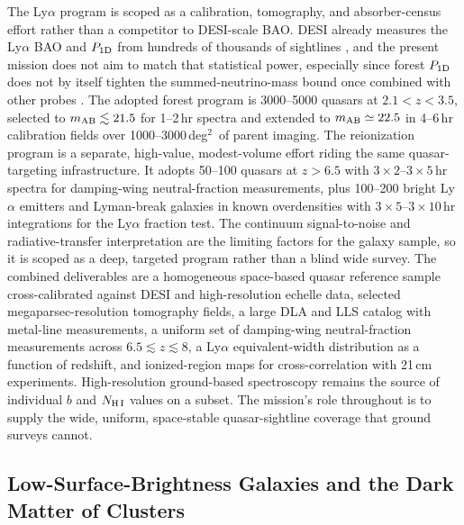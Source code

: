 \documentclass[10pt,onecolumn]{article}
\newcommand{\degti}{deg$^2$}
\begin{document}
The Ly$\alpha$ program is scoped as a calibration, tomography, and absorber-census effort rather than a competitor to DESI-scale BAO. DESI already measures the Ly$\alpha$ BAO and $P_{\rm 1D}$ from hundreds of thousands of sightlines \cite{desi2024lya,karacayli2025}, and the present mission does not aim to match that statistical power, especially since forest $P_{\rm 1D}$ does not by itself tighten the summed-neutrino-mass bound once combined with other probes \cite{chaves2026}. The adopted forest program is 3000--5000 quasars at $2.1<z<3.5$, selected to $m_{\rm AB}\lesssim21.5$ for 1--2\,hr spectra and extended to $m_{\rm AB}\simeq22.5$ in 4--6\,hr calibration fields over 1000--3000\,\degti\ of parent imaging. The reionization program is a separate, high-value, modest-volume effort riding the same quasar-targeting infrastructure. It adopts 50--100 quasars at $z>6.5$ with $3\times2$--$3\times5$\,hr spectra for damping-wing neutral-fraction measurements, plus 100--200 bright Ly$\alpha$ emitters and Lyman-break galaxies in known overdensities with $3\times5$--$3\times10$\,hr integrations for the Ly$\alpha$ fraction test. The continuum signal-to-noise and radiative-transfer interpretation are the limiting factors for the galaxy sample, so it is scoped as a deep, targeted program rather than a blind wide survey. The combined deliverables are a homogeneous space-based quasar reference sample cross-calibrated against DESI and high-resolution echelle data, selected megaparsec-resolution tomography fields, a large DLA and LLS catalog with metal-line measurements, a uniform set of damping-wing neutral-fraction measurements across $6.5\lesssim z\lesssim8$, a Ly$\alpha$ equivalent-width distribution as a function of redshift, and ionized-region maps for cross-correlation with 21\,cm experiments. High-resolution ground-based spectroscopy remains the source of individual $b$ and $N_{\rm H\,I}$ values on a subset. The mission's role throughout is to supply the wide, uniform, space-stable quasar-sightline coverage that ground surveys cannot.

\subsection{Low-Surface-Brightness Galaxies and the Dark Matter of Clusters}\label{sec:lsb}
\end{document}
